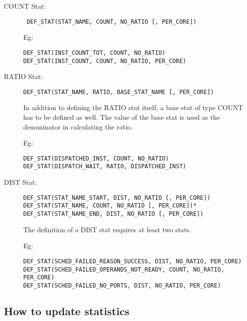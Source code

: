 \smallskip
\begin{description}

\item[COUNT Stat:] 
\begin{lstlisting}
 DEF_STAT(STAT_NAME, COUNT, NO_RATIO [, PER_CORE])
\end{lstlisting}

Eg: 
\begin{lstlisting}
DEF_STAT(INST_COUNT_TOT, COUNT, NO_RATIO)
DEF_STAT(INST_COUNT, COUNT, NO_RATIO, PER_CORE)
\end{lstlisting}

\item[RATIO Stat:] 
\begin{lstlisting}
DEF_STAT(STAT_NAME, RATIO, BASE_STAT_NAME [, PER_CORE])
\end{lstlisting}

In addition to defining the RATIO stat itself, a base stat of type COUNT has to
be defined as well. The value of the base stat is used as the denominator in
calculating the ratio. 

Eg: 
\begin{lstlisting}
DEF_STAT(DISPATCHED_INST, COUNT, NO_RATIO)
DEF_STAT(DISPATCH_WAIT, RATIO, DISPATCHED_INST)
\end{lstlisting}

\item[DIST Stat:] 
\begin{lstlisting}
DEF_STAT(STAT_NAME_START, DIST, NO_RATIO [, PER_CORE])
DEF_STAT(STAT_NAME, COUNT, NO_RATIO [, PER_CORE])*
DEF_STAT(STAT_NAME_END, DIST, NO_RATIO [, PER_CORE])
\end{lstlisting}

The definition of a DIST stat requires at least two stats.

Eg: 
\begin{lstlisting}
DEF_STAT(SCHED_FAILED_REASON_SUCCESS, DIST, NO_RATIO, PER_CORE)
DEF_STAT(SCHED_FAILED_OPERANDS_NOT_READY, COUNT, NO_RATIO, PER_CORE)
DEF_STAT(SCHED_FAILED_NO_PORTS, DIST, NO_RATIO, PER_CORE)
\end{lstlisting}

\end{description}


\smallskip



\subsection{How to update statistics}

